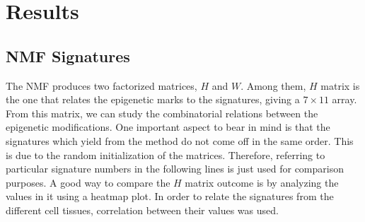
\chapter{Results}\label{Results} %


\section{NMF Signatures}

The NMF produces two factorized matrices, \(H\) and \(W\). Among them, \(H\) matrix is the one that relates the epigenetic marks to the signatures, giving a \(7 \times 11\) array. From this matrix, we can study the combinatorial relations between the epigenetic modifications. One important aspect to bear in mind is that the signatures which yield from the method do not come off in the same order. This is due to the random initialization of the matrices. Therefore, referring to particular signature numbers in the following lines is just used for comparison purposes. A good way to compare the \(H\) matrix outcome is by analyzing the values in it using a heatmap plot. In order to relate the signatures from the different cell tissues, correlation between their values was used.

